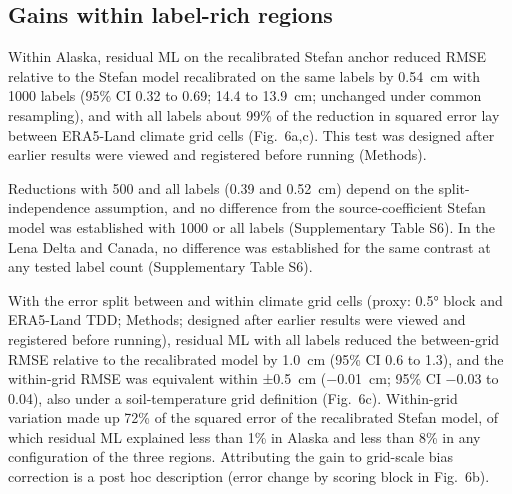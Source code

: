 
\subsection{Gains within label-rich regions}
\label{sec:results-label-rich}

Within Alaska, residual ML on the recalibrated Stefan anchor reduced RMSE relative to the Stefan model recalibrated on the same labels by 0.54~cm with 1000 labels (95\% CI 0.32 to 0.69; 14.4 to 13.9~cm; unchanged under common resampling), and with all labels about 99\% of the reduction in squared error lay between ERA5-Land climate grid cells\cite{munozsabater2021_era5_land} (Fig.~6a,c).
This test was designed after earlier results were viewed and registered before running (Methods).

Reductions with 500 and all labels (0.39 and 0.52~cm) depend on the split-independence assumption, and no difference from the source-coefficient Stefan model was established with 1000 or all labels (Supplementary Table S6).
In the Lena Delta and Canada, no difference was established for the same contrast at any tested label count (Supplementary Table S6).

With the error split between and within climate grid cells (proxy: 0.5° block and ERA5-Land TDD; Methods; designed after earlier results were viewed and registered before running), residual ML with all labels reduced the between-grid RMSE relative to the recalibrated model by 1.0~cm (95\% CI 0.6 to 1.3), and the within-grid RMSE was equivalent within ±0.5~cm (−0.01~cm; 95\% CI −0.03 to 0.04), also under a soil-temperature grid definition (Fig.~6c).
Within-grid variation made up 72\% of the squared error of the recalibrated Stefan model, of which residual ML explained less than 1\% in Alaska and less than 8\% in any configuration of the three regions.
Attributing the gain to grid-scale bias correction is a post hoc description (error change by scoring block in Fig.~6b).

